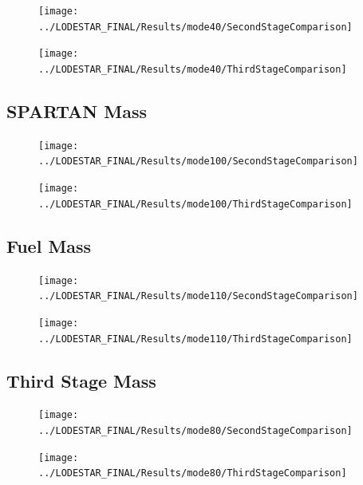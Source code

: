 \begin{figure}[!th]
\centering
\texttt{[image: ../LODESTAR\_FINAL/Results/mode40/SecondStageComparison]}
\caption{}
\label{fig:SecondStageComparison3}
\end{figure}

\begin{figure}[!th]
\centering
\texttt{[image: ../LODESTAR\_FINAL/Results/mode40/ThirdStageComparison]}
\caption{}
\label{fig:ThirdStageComparison3}
\end{figure}
\FloatBarrier
\subsection{SPARTAN Mass}

\begin{figure}[th]
\centering
\texttt{[image: ../LODESTAR\_FINAL/Results/mode100/SecondStageComparison]}
\caption{}
\label{fig:SecondStageComparison4}
\end{figure}

\begin{figure}[th]
\centering
\texttt{[image: ../LODESTAR\_FINAL/Results/mode100/ThirdStageComparison]}
\caption{}
\label{fig:ThirdStageComparison4}
\end{figure}
\FloatBarrier
\subsection{Fuel Mass}
\begin{figure}[th]
\centering
\texttt{[image: ../LODESTAR\_FINAL/Results/mode110/SecondStageComparison]}
\caption{}
\label{fig:SecondStageComparison5}
\end{figure}

\begin{figure}[th]
\centering
\texttt{[image: ../LODESTAR\_FINAL/Results/mode110/ThirdStageComparison]}
\caption{}
\label{fig:ThirdStageComparison5}
\end{figure}
\FloatBarrier
\subsection{Third Stage Mass}

\begin{figure}[th]
\centering
\texttt{[image: ../LODESTAR\_FINAL/Results/mode80/SecondStageComparison]}
\caption{}
\label{fig:SecondStageComparison6}
\end{figure}


\begin{figure}[th]
\centering
\texttt{[image: ../LODESTAR\_FINAL/Results/mode80/ThirdStageComparison]}
\caption{}
\label{fig:ThirdStageComparison6}
\end{figure}

